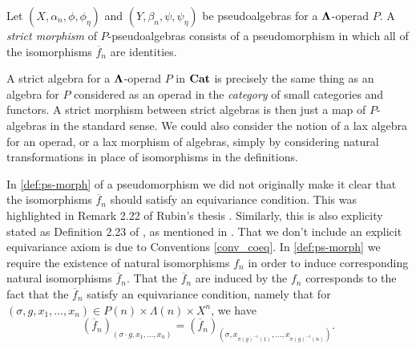 \begin{Defi}
Let $(X, \alpha_n,\phi,\phi_\eta)$ and $(Y, \beta_n,\psi,\psi_{\eta})$ be pseudoalgebras for a $\mathbf{\Lambda}$-operad $P$. A \textit{strict morphism} of $P$-pseudoalgebras consists of a pseudomorphism in which all of the isomorphisms $\overline{f}_{n}$ are identities.
\end{Defi}

\begin{rem}
A strict algebra for a $\mathbf{\Lambda}$-operad $P$ in $\mathbf{Cat}$ is precisely the same thing as an algebra for $P$ considered as an operad in the \textit{category} of small categories and functors. A strict morphism between strict algebras is then just a map of $P$-algebras in the standard sense. We could also consider the notion of a lax algebra for an operad, or a lax morphism of algebras, simply by considering natural transformations in place of isomorphisms in the definitions.

In \cref{def:ps-morph} of a pseudomorphism we did not originally make it clear that the isomorphisms $\overline{f}_n$ should satisfy an equivariance condition. This was highlighted in Remark 2.22 of Rubin's thesis \cite{rubin-thesis}. Similarly, this is also explicity stated as Definition 2.23 of \cite{guillou_symmetric}, as mentioned in \cite{guillou_multiplicative}. That we don't include an explicit equivariance axiom is due to Conventions \ref{conv_coeq}. In \cref{def:ps-morph} we require the existence of natural isomorphisms $f_n$ in order to induce corresponding natural isomorphisms $\overline{f}_n$. That the $\overline{f}_n$ are induced by the $f_n$ corresponds to the fact that the $\overline{f}_n$ satisfy an equivariance condition, namely that for $(\sigma, g, x_1, \ldots, x_n) \in P(n) \times \Lambda(n) \times X^n$, we have
  \[
    \left(\overline{f}_n\right)_{\left(\sigma \cdot g, x_1, \ldots, x_n\right)} = \left(\overline{f}_n\right)_{\left(\sigma,x_{\pi(g)^{-1}(1)},\ldots,x_{\pi(g)^{-1}(n)}\right)}.
  \]
\end{rem}

